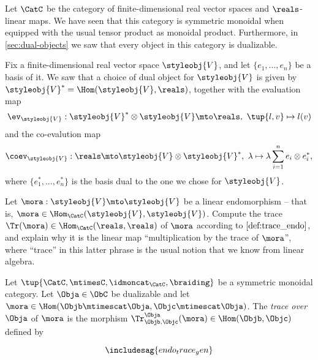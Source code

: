 \begin{gradedexercise}\label{ex:LinearAlgebraTrace}
Let $\CatC$ be the category of finite-dimensional real vector spaces and $\reals$-linear maps. We have seen that this category is symmetric monoidal when equipped with the usual tensor product as monoidal product. Furthermore, in \cref{sec:dual-objects} we saw that every object in this category is dualizable. 

Fix a finite-dimensional real vector space $\styleobj{V}$, and let $\{e_1,...,e_n \}$ be a basis of it. We saw that a choice of dual object for $\styleobj{V}$ is given by $\styleobj{V}^* = \Hom(\styleobj{V}, \reals)$, together with the evaluation map
$$
\ev_\styleobj{V}  : \styleobj{V}^* \otimes \styleobj{V}  \mto \reals, \ \tup{l, v} \mapsto l(v)
$$
and the co-evalution map
$$
\coev_\styleobj{V}  : \reals \mto \styleobj{V}  \otimes \styleobj{V}^*, \ \lambda \mapsto \lambda \sum_{i=1}^n e_i \otimes e_i^*,
$$
where $\{e_1^*,...,e_n^* \}$ is the basis dual to the one we chose for $\styleobj{V}$. 

Let $\mora: \styleobj{V} \mto \styleobj{V}$ be a linear endomorphism -- that is, $\mora \in \Hom_\CatC(\styleobj{V}, \styleobj{V})$. Compute the trace $\Tr(\mora) \in \Hom_\CatC(\reals, \reals)$ of $\mora$ according to $\cref{def:trace_endo}$, and explain why it is the linear map ``multiplication by the trace of $\mora$'', where ``trace'' in this latter phrase is the usual notion that we know from linear algebra. 

\end{gradedexercise}

\begin{ctdefinition}
  \label{def:trace_gen_endo}
Let $\tup{\CatC,\mtimesC,\idmoncat_{\CatC}, \braiding}$ be a symmetric monoidal category. Let $\Obja \in \ObC$ be dualizable and let $\mora \in \Hom(\Objb \mtimescat \Obja, \Objc \mtimescat \Obja)$. The \emph{trace over} $\Obja$ of $\mora$ is the morphism $\Tr_{\Objb, \Objc}^\Obja (\mora) \in \Hom(\Objb, \Objc)$ defined by

  \begin{equation}
\includesag{endo_trace_gen}
\end{equation}
\end{ctdefinition}

